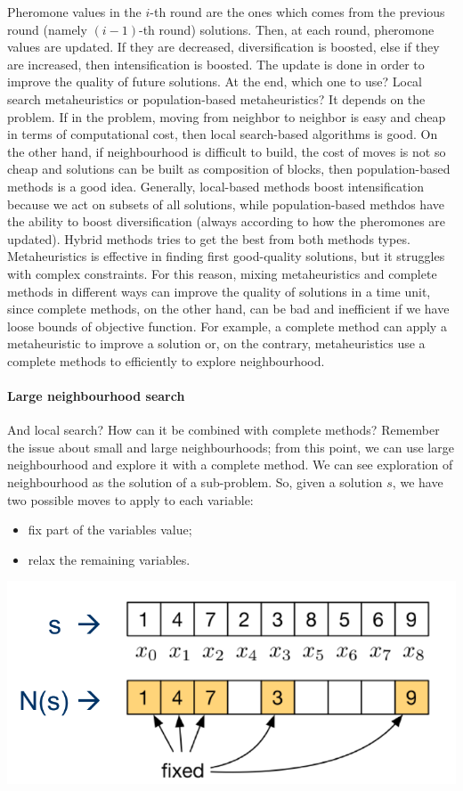 \documentclass[10pt,a4paper]{article}
\begin{document}
Pheromone values in the $i$-th round are the ones which comes from the previous
round (namely $(i-1)$-th round) solutions. Then, at each round, pheromone values
are updated. If they are decreased, diversification is boosted, else if they are
increased, then intensification is boosted. The update is done in order to
improve the quality of future solutions. At the end, which one to use? Local
search metaheuristics or population-based metaheuristics? It depends on the
problem. If in the problem, moving from neighbor to neighbor is easy and cheap
in terms of computational cost, then local search-based algorithms is good. On
the other hand, if neighbourhood is difficult to build, the cost of moves is not
so cheap and solutions can be built as composition of blocks, then
population-based methods is a good idea. Generally, local-based methods boost
intensification because we act on subsets of all solutions, while
population-based methdos have the ability to boost diversification (always
according to how the pheromones are updated). Hybrid methods tries to get the
best from both methods types. Metaheuristics is effective in finding first
good-quality solutions, but it struggles with complex constraints. For this
reason, mixing metaheuristics and complete methods in different ways can improve
the quality of solutions in a time unit, since complete methods, on the other
hand, can be bad and inefficient if we have loose bounds of objective function.
For example, a complete method can apply a metaheuristic to improve a solution
or, on the contrary, metaheuristics use a complete methods to efficiently to
explore neighbourhood.

\pagebreak

\paragraph{Large neighbourhood search}
And local search? How can it be combined with complete methods? Remember the
issue about small and large neighbourhoods; from this point, we can use large
neighbourhood and explore it with a complete method. We can see exploration of
neighbourhood as the solution of a sub-problem. So, given a solution $s$, we
have two possible moves to apply to each variable:
\begin{itemize}
    \item fix part of the variables value;
    \item relax the remaining variables.
\end{itemize}
\includegraphics[scale=0.25]{fix_relax.png}
\end{document}
